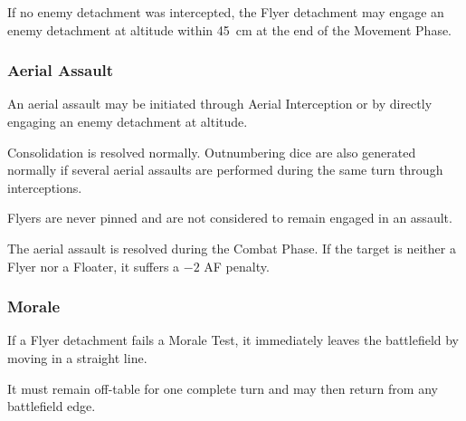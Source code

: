 If no enemy detachment was intercepted, the Flyer detachment may engage an enemy detachment at altitude within 45~cm at the end of the Movement Phase.

\subsubsection{Aerial Assault}

An aerial assault may be initiated through Aerial Interception or by directly engaging an enemy detachment at altitude.

Consolidation is resolved normally. Outnumbering dice are also generated normally if several aerial assaults are performed during the same turn through interceptions.

Flyers are never pinned and are not considered to remain engaged in an assault.

The aerial assault is resolved during the Combat Phase. If the target is neither a Flyer nor a Floater, it suffers a $-2$ AF penalty.

\subsubsection{Morale}

If a Flyer detachment fails a Morale Test, it immediately leaves the battlefield by moving in a straight line.

It must remain off-table for one complete turn and may then return from any battlefield edge.

